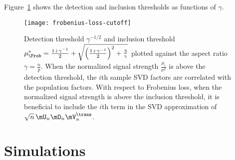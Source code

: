 Figure~\ref{F:frobenius-loss-cutoff} shows the detection and inclusion 
thresholds as functions of $\gamma$.

\begin{figure}[hbt]
    \centering
    \texttt{[image: frobenius-loss-cutoff]}
    \caption{
        Detection threshold $\gamma^{-1/2}$ and
        inclusion threshold
        $
            \mu_\Frob^\ast
            =
            \frac{1 + \gamma^{-1}}{2}
            +
            \sqrt{
                \left( \frac{1 + \gamma^{-1} }{2} \right)^2
                +
                \frac{3}{\gamma}
            }
        $
        plotted against the aspect ratio $\gamma = \frac{n}{p}$.  When
        the normalized signal strength $\frac{\mu_i}{\sigma^2}$ is above the 
        detection threshold, the $i$th sample SVD factors are correlated with
        the population factors.  With respect to Frobenius loss, when the 
        normalized signal strength is above the inclusion threshold, it is 
        beneficial to include the $i$th term in the SVD approximation of 
        $\sqrt{n} \, \mU_n \mD_n \mV_n^\trans$.
    }\label{F:frobenius-loss-cutoff}
\end{figure}

\clearpage

\section{Simulations}\label{S:intrinsic-loss-simulations}

